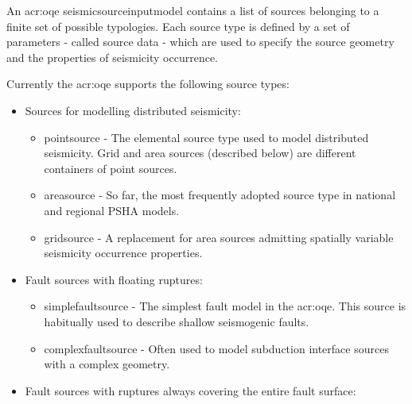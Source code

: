 An \glsdesc{acr:oqe} \gls{seismicsourceinputmodel} contains a list of sources
belonging to a finite set of possible typologies. Each source type is defined
by a set of parameters - called source data - which are used to specify the
source geometry and the properties of seismicity occurrence.

Currently the \glsdesc{acr:oqe} supports the following source types:

\begin{itemize}


    
    \item Sources for modelling distributed seismicity:

    \begin{itemize}

        \item \Gls{pointsource} - The elemental source type used to model
        distributed seismicity. Grid and area sources (described below) are
        different containers of point sources.

        \item \Gls{areasource} - So far, the most frequently adopted source
        type in national and regional PSHA models.

        \item \Gls{gridsource} - A replacement for area sources admitting
        spatially variable seismicity occurrence properties.

    \end{itemize}

    \item Fault sources with floating ruptures:

    \begin{itemize}

        \item \Gls{simplefaultsource} - The simplest fault model in the
        \glsdesc{acr:oqe}. This source is habitually used to describe shallow
        seismogenic faults.

        \item \Gls{complexfaultsource} - Often used to model subduction
        interface sources with a complex geometry.

    \end{itemize}

    \item Fault sources with ruptures always covering the entire fault surface:

    \begin{itemize}


\end{itemize}
\end{itemize}
